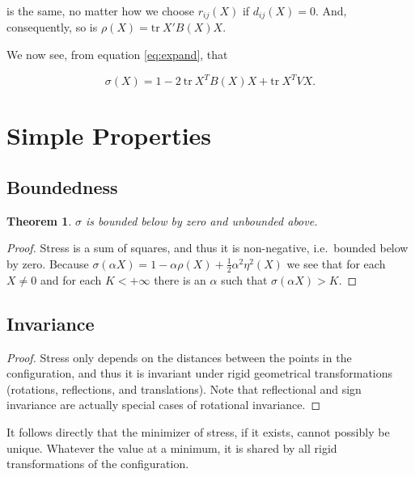 \documentclass[
  12pt,
]{book}
\newtheorem{theorem}{Theorem}[chapter]
\theoremstyle{definition}
\theoremstyle{definition}
\theoremstyle{definition}
\theoremstyle{definition}
\theoremstyle{remark}
\begin{document}
is the same, no matter how we choose \(r_{ij}(X)\) if \(d_{ij}(X)=0\). And, consequently, so is \(\rho(X)=\text{tr}\ X'B(X)X\).

We now see, from equation \eqref{eq:expand}, that

\begin{equation}
\sigma(X)=1-2\ \text{tr}\ X^TB(X)X+\text{tr}\ X^TVX.
\label{eq:propmatexp}
\end{equation}

\hypertarget{propglobal}{%
\section{Simple Properties}\label{propglobal}}

\hypertarget{propbounded}{%
\subsection{Boundedness}\label{propbounded}}

\begin{theorem}
\(\sigma\) is bounded below by zero and unbounded above.
\end{theorem}

\begin{proof}
Stress is a sum of squares, and thus it is non-negative, i.e.~bounded below by zero. Because \(\sigma(\alpha X)=1-\alpha\rho(X)+\frac12\alpha^2\eta^2(X)\) we see that for each \(X\not= 0\) and for each \(K<+\infty\) there is an \(\alpha\) such that
\(\sigma(\alpha X)>K\).
\end{proof}

\hypertarget{propinvariance}{%
\subsection{Invariance}\label{propinvariance}}

\begin{proof}
Stress only depends on the distances between the points in the configuration, and thus it is invariant under rigid geometrical transformations (rotations, reflections, and translations). Note that reflectional and sign invariance are actually special cases of rotational invariance.
\end{proof}

It follows directly that the minimizer of stress, if it exists, cannot possibly be unique. Whatever the value at a minimum, it is shared by all rigid transformations of the configuration.
\end{document}
